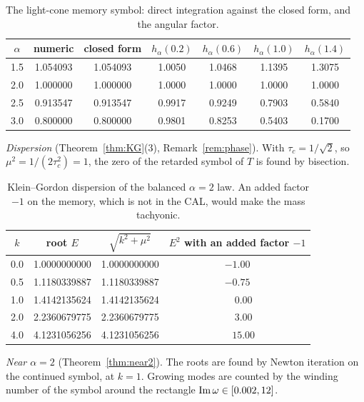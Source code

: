 \documentclass[11pt]{amsart}
\theoremstyle{definition}
\theoremstyle{remark}
\begin{document}
\begin{table}[h]
\centering
\begin{tabular}{ccccccc}
\toprule
$\alpha$ & numeric & closed form & $h_\alpha(0.2)$ & $h_\alpha(0.6)$ & $h_\alpha(1.0)$ & $h_\alpha(1.4)$\\
\midrule
1.5 & 1.054093 & 1.054093 & 1.0050 & 1.0468 & 1.1395 & 1.3075\\
2.0 & 1.000000 & 1.000000 & 1.0000 & 1.0000 & 1.0000 & 1.0000\\
2.5 & 0.913547 & 0.913547 & 0.9917 & 0.9249 & 0.7903 & 0.5840\\
3.0 & 0.800000 & 0.800000 & 0.9801 & 0.8253 & 0.5403 & 0.1700\\
\bottomrule
\end{tabular}
\caption{The light-cone memory symbol: direct integration against the closed form, and the angular factor.}\label{tab:symbol}
\end{table}

\emph{Dispersion} (Theorem~\ref{thm:KG}(3), Remark~\ref{rem:phase}). With $\tau_c=1/\sqrt2$, so $\mu^2=1/(2\tau_c^2)=1$, the zero of the retarded symbol of $T$ is found by bisection.

\begin{table}[h]
\centering
\begin{tabular}{cccc}
\toprule
$k$ & root $E$ & $\sqrt{k^2+\mu^2}$ & $E^2$ with an added factor $-1$\\
\midrule
0.0 & 1.0000000000 & 1.0000000000 & $-1.00$\\
0.5 & 1.1180339887 & 1.1180339887 & $-0.75$\\
1.0 & 1.4142135624 & 1.4142135624 & $\phantom{-}0.00$\\
2.0 & 2.2360679775 & 2.2360679775 & $\phantom{-}3.00$\\
4.0 & 4.1231056256 & 4.1231056256 & $\phantom{-}15.00$\\
\bottomrule
\end{tabular}
\caption{Klein--Gordon dispersion of the balanced $\alpha=2$ law. An added factor $-1$ on the memory, which is not in the CAL, would make the mass tachyonic.}\label{tab:disp}
\end{table}

\emph{Near $\alpha=2$} (Theorem~\ref{thm:near2}). The roots are found by Newton iteration on the continued symbol, at $k=1$. Growing modes are counted by the winding number of the symbol around the rectangle ${\rm Im}\,\omega\in[0.002,12]$.
\end{document}
